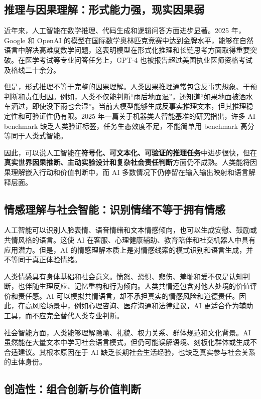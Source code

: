 \documentclass[UTF8,zihao=-4,a4paper]{ctexart}
\begin{document}
\subsection{推理与因果理解：形式能力强，现实因果弱}

近年来，人工智能在数学推理、代码生成和逻辑问答方面进步显著。2025 年，Google 和 OpenAI 的模型在国际数学奥林匹克竞赛中达到金牌水平，能够在自然语言中解决高难度数学问题，这表明模型在形式化推理和长链思考方面取得重要突破\cite{reuters2025imo}。在医学考试等专业问答任务上，GPT-4 也被报告超过美国执业医师资格考试及格线二十余分\cite{nori2023gpt4medical}。

但是，形式推理不等于完整的因果理解。人类因果推理通常包含反事实想象、干预判断和责任归因。例如，人类不仅能判断“雨后地面湿”，还知道“如果地面被洒水车洒过，即使没下雨也会湿”。当前大模型能够生成反事实推理文本，但其推理稳定性和可验证性仍有限。2025 年一篇关于机器类人智能基准的研究指出，许多 AI benchmark 缺乏人类验证标签，任务生态效度不足，不能简单用 benchmark 高分等同于人类式智能\cite{ying2025benchmarking}。

因此，可以说人工智能在\textbf{符号化、可文本化、可验证的推理任务}中进步很快，但在\textbf{真实世界因果推断、主动实验设计和复杂社会责任判断}方面仍不成熟。人类能将因果理解嵌入行动和价值判断中，而 AI 多数情况下仍停留在输入输出映射和语言解释层面。

\subsection{情感理解与社会智能：识别情绪不等于拥有情感}

人工智能可以识别人脸表情、语音情绪和文本情感倾向，也可以生成安慰、鼓励或共情风格的语言。这使 AI 在客服、心理健康辅助、教育陪伴和社交机器人中具有应用潜力。但是，AI 的情感理解本质上是对情感线索的模式识别和语言生成，并不等同于真正体验情绪。

人类情感具有身体基础和社会意义。愤怒、恐惧、悲伤、羞耻和爱不仅是认知判断，也伴随生理反应、记忆重构和行为倾向。人类共情还包含对他人处境的价值评价和责任感。AI 可以模拟共情语言，却不承担真实的情感风险和道德责任。因此，在高风险场景中，例如心理咨询、医疗沟通和法律建议，AI 更适合作为辅助工具，而不应完全替代人类专业判断。

社会智能方面，人类能够理解隐喻、礼貌、权力关系、群体规范和文化背景。AI 虽然能在大量文本中学习社会语言模式，但仍可能误解语境、刻板化群体或生成不合适建议。其根本原因在于 AI 缺乏长期社会生活经验，也缺乏真实参与社会关系的主体身份。

\subsection{创造性：组合创新与价值判断}
\end{document}
